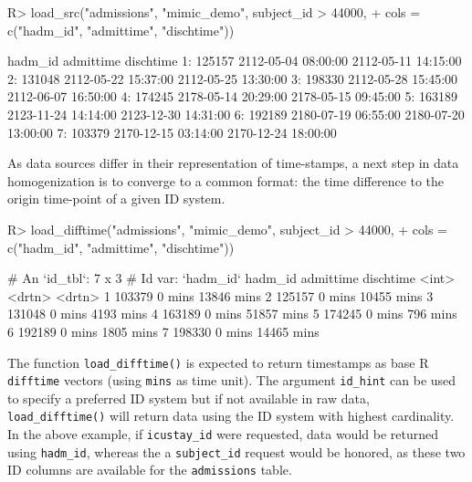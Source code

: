 \documentclass[
  notitle]{jss}
\begin{document}
\begin{CodeChunk}
\begin{CodeInput}
R> load_src("admissions", "mimic_demo", subject_id > 44000,
+          cols = c("hadm_id", "admittime", "dischtime"))
\end{CodeInput}
\begin{CodeOutput}
   hadm_id           admittime           dischtime
1:  125157 2112-05-04 08:00:00 2112-05-11 14:15:00
2:  131048 2112-05-22 15:37:00 2112-05-25 13:30:00
3:  198330 2112-05-28 15:45:00 2112-06-07 16:50:00
4:  174245 2178-05-14 20:29:00 2178-05-15 09:45:00
5:  163189 2123-11-24 14:14:00 2123-12-30 14:31:00
6:  192189 2180-07-19 06:55:00 2180-07-20 13:00:00
7:  103379 2170-12-15 03:14:00 2170-12-24 18:00:00
\end{CodeOutput}
\end{CodeChunk}

As data sources differ in their representation of time-stamps, a next
step in data homogenization is to converge to a common format: the time
difference to the origin time-point of a given ID system.

\begin{CodeChunk}
\begin{CodeInput}
R> load_difftime("admissions", "mimic_demo", subject_id > 44000,
+               cols = c("hadm_id", "admittime", "dischtime"))
\end{CodeInput}
\end{CodeChunk}

\begin{CodeChunk}
\begin{CodeOutput}
# An `id_tbl`: 7 x 3
# Id var:      `hadm_id`
  hadm_id admittime dischtime
    <int> <drtn>    <drtn>
1  103379 0 mins    13846 mins
2  125157 0 mins    10455 mins
3  131048 0 mins     4193 mins
4  163189 0 mins    51857 mins
5  174245 0 mins      796 mins
6  192189 0 mins     1805 mins
7  198330 0 mins    14465 mins
\end{CodeOutput}
\end{CodeChunk}

The function \texttt{load\_difftime()} is expected to return timestamps
as base R \texttt{difftime} vectors (using \texttt{mins} as time unit).
The argument \texttt{id\_hint} can be used to specify a preferred ID
system but if not available in raw data, \texttt{load\_difftime()} will
return data using the ID system with highest cardinality. In the above
example, if \texttt{icustay\_id} were requested, data would be returned
using \texttt{hadm\_id}, whereas the a \texttt{subject\_id} request
would be honored, as these two ID columns are available for the
\texttt{admissions} table.
\end{document}
